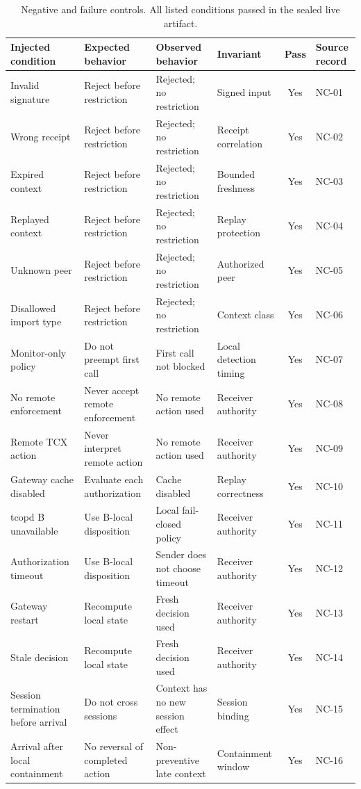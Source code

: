 \begin{table}[t]\centering\scriptsize
\caption{Negative and failure controls. All listed conditions passed in the sealed live artifact.}
\begin{tabular}{@{}p{}@{\hspace{0.2em}}p{}@{\hspace{0.2em}}p{}@{\hspace{0.2em}}p{}@{\hspace{0.2em}}c@{\hspace{0.2em}}p{}@{}}\toprule
Injected condition & Expected behavior & Observed behavior & Invariant & Pass & Source record \\ \midrule
Invalid signature & Reject before restriction & Rejected; no restriction & Signed input & Yes & NC-01 \\
Wrong receipt & Reject before restriction & Rejected; no restriction & Receipt correlation & Yes & NC-02 \\
Expired context & Reject before restriction & Rejected; no restriction & Bounded freshness & Yes & NC-03 \\
Replayed context & Reject before restriction & Rejected; no restriction & Replay protection & Yes & NC-04 \\
Unknown peer & Reject before restriction & Rejected; no restriction & Authorized peer & Yes & NC-05 \\
Disallowed import type & Reject before restriction & Rejected; no restriction & Context class & Yes & NC-06 \\
Monitor-only policy & Do not preempt first call & First call not blocked & Local detection timing & Yes & NC-07 \\
No remote enforcement & Never accept remote enforcement & No remote action used & Receiver authority & Yes & NC-08 \\
Remote TCX action & Never interpret remote action & No remote action used & Receiver authority & Yes & NC-09 \\
Gateway cache disabled & Evaluate each authorization & Cache disabled & Replay correctness & Yes & NC-10 \\
tcopd B unavailable & Use B-local disposition & Local fail-closed policy & Receiver authority & Yes & NC-11 \\
Authorization timeout & Use B-local disposition & Sender does not choose timeout & Receiver authority & Yes & NC-12 \\
Gateway restart & Recompute local state & Fresh decision used & Receiver authority & Yes & NC-13 \\
Stale decision & Recompute local state & Fresh decision used & Receiver authority & Yes & NC-14 \\
Session termination before arrival & Do not cross sessions & Context has no new session effect & Session binding & Yes & NC-15 \\
Arrival after local containment & No reversal of completed action & Non-preventive late context & Containment window & Yes & NC-16 \\ \bottomrule
\end{tabular}\label{tab:controls}\end{table}
